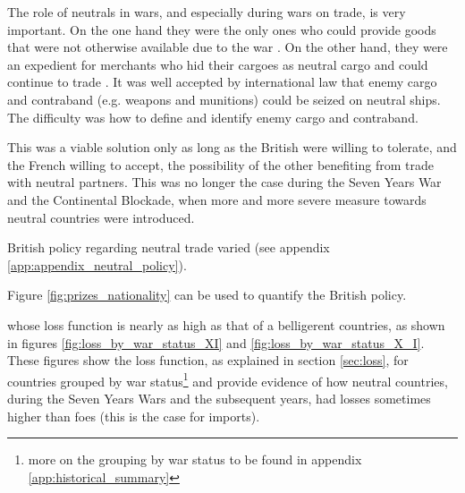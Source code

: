 \documentclass[12pt,a4paper,notitlepage,english]{article}
\begin{document}
 
%

The role of neutrals in wars, and especially during wars on trade, is very important.
On the one hand they were the only ones who could provide goods that were not otherwise available due to the war \citep{Hedberg2015}.
On the other hand, they were an expedient for merchants who hid their cargoes as neutral cargo and could continue to trade \cite[see][]{Carriere1973,Schnakenbourg2013,Schnakenbourg2015}. 
It was well accepted by international law that enemy cargo and contraband (e.g. weapons and munitions) could be seized on neutral ships.
The difficulty was how to define and identify enemy cargo and contraband.

This was a viable solution only as long as the British were willing to tolerate, and the French willing to accept, the possibility of the other benefiting from trade with neutral partners. This was no longer the case during the Seven Years War and the Continental Blockade, when more and more severe measure towards neutral countries were introduced. 

British policy regarding neutral trade varied (see appendix \ref{app:appendix_neutral_policy}).


Figure \ref{fig:prizes_nationality} can be used to quantify the British policy.



whose loss function is nearly as high as that of a belligerent countries, as shown in figures \ref{fig:loss_by_war_status_XI} and \ref{fig:loss_by_war_status_X_I}.
These figures show the loss function, as explained in section \ref{sec:loss}, for countries grouped by war status\footnote{more on the grouping by war status to be found in appendix \ref{app:historical_summary}} and provide evidence of how neutral countries, during the Seven Years Wars and the subsequent years, had losses sometimes higher than foes (this is the case for imports). 
\end{document}
